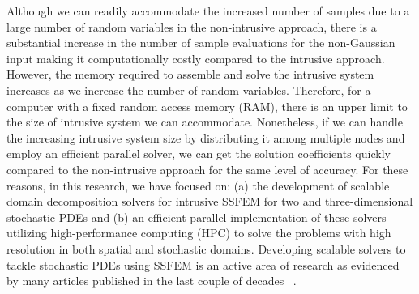 \documentclass[letter,1p,11pt,oneside,onecolumn,sort&compress]{elsarticle}
\begin{document}
Although we can readily accommodate the increased number of samples due to a large number of random variables in the non-intrusive approach, there is a substantial increase in the number of sample evaluations for the non-Gaussian input making it computationally costly compared to the intrusive approach. %
However, the memory required to assemble and solve the intrusive system increases as we increase the number of random variables. Therefore, for a computer with a fixed random access memory (RAM), there is an upper limit to the size of intrusive system we can accommodate. Nonetheless, if we can handle the increasing intrusive system size by distributing it among multiple nodes and employ an efficient parallel solver, we can get the solution coefficients quickly compared to the non-intrusive approach for the same level of accuracy.
For these reasons, in this research, we have focused on:
(a) the development of scalable domain decomposition solvers for intrusive SSFEM for two and three-dimensional stochastic PDEs and
(b) an efficient parallel implementation of these solvers utilizing high-performance computing (HPC) to solve the problems with high resolution in both spatial and stochastic domains.
Developing scalable solvers to tackle stochastic PDEs using SSFEM is an active area of research as evidenced by many articles published in the last couple of decades ~\cite{pellissetti2000iterative,le2003multigrid,chung2005efficient,elman2007solving,powell2009block,ghosh2009feti,ullmann2010kronecker,sousedik2014hierarchical,subber2014schwarz,subber2012PhDTh,powell2017efficient,stavroulakis2017gpu,pranesh2018feti}.


\end{document}
